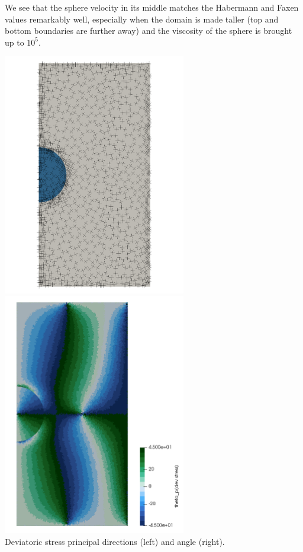 We see that the sphere velocity in its middle 
matches the Habermann and Faxen values remarkably well, 
especially when the domain is made taller (top and bottom 
boundaries are further away) and the viscosity of the 
sphere is brought up to $10^5$.


\begin{center}
\includegraphics[width=8cm]{python_codes/fieldstone_92/results/stress.png}
\includegraphics[width=8cm]{python_codes/fieldstone_92/results/theta.png}\\
{\captionfont Deviatoric stress principal directions (left) and angle (right).} 
\end{center}

